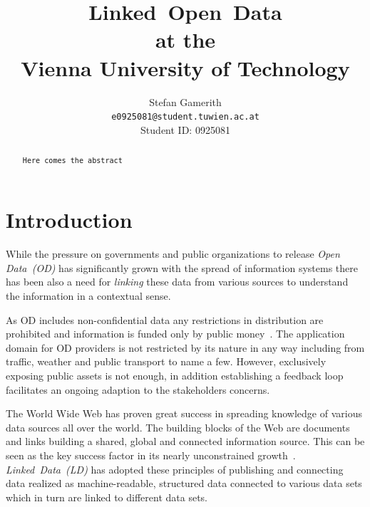\documentclass{article}
\begin{document}
\renewcommand{\bibname}{References}

\pagestyle{plain}

\title{Linked~Open~Data\\ at the \\Vienna University of Technology}
\date{}
\author{Stefan Gamerith\\
\texttt{e0925081@student.tuwien.ac.at} \\ Student ID: 0925081}

\maketitle

\begin{abstract}
	\texttt{Here comes the abstract}
\end{abstract}

\newpage
\tableofcontents

\newpage
{}

\section{Introduction}
While the pressure on governments and public organizations to release \textit{Open Data~(OD)} has significantly grown with the spread of information systems there has been also a need for \textit{linking} these data from various sources to understand the information in a contextual sense.

As OD includes non-confidential data any restrictions in distribution are prohibited and information is funded only by public money~\cite{article:janssen2012benefits}. The application domain for OD providers is not restricted by its nature in any way including from traffic, weather and public transport to name a few. However, exclusively exposing public assets is not enough, in addition establishing a feedback loop facilitates an ongoing adaption to the stakeholders concerns. 

The World Wide Web has proven great success in spreading knowledge of various data sources all over the world. The building blocks of the Web are documents and links building a shared, global and connected information source. This can be seen as the key success factor in its nearly unconstrained growth~\cite{report:jacobs-i-2004--a}. 
\textit{Linked~Data~(LD)} has adopted these principles of publishing and connecting data realized as machine-readable, structured data connected to various data sets which in turn are linked to different data sets. 
\end{document}

